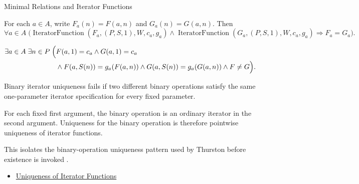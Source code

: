 \begin{topicbox}{Minimal Relations and Iterator Functions}
\begin{remark*}
For each $a\in A$, write $F_a(n)=F(a,n)$ and $G_a(n)=G(a,n)$. Then
\[
\forall a\in A\;
\bigl(\operatorname{IteratorFunction}(F_a,(P,S,1),W,c_a,g_a)
\land \operatorname{IteratorFunction}(G_a,(P,S,1),W,c_a,g_a)
\Longrightarrow F_a=G_a\bigr).
\]
\end{remark*}

\begin{remark*}
\[
\begin{aligned}
\exists a\in A\;\exists n\in P\;\Bigl(&
F(a,1)=c_a\land G(a,1)=c_a\\
&\land F(a,S(n))=g_a(F(a,n))
\land G(a,S(n))=g_a(G(a,n))
\land F\neq G\Bigr).
\end{aligned}
\]
\end{remark*}

\begin{remark*}
Binary iterator uniqueness fails if two different binary operations satisfy
the same one-parameter iterator specification for every fixed parameter.
\end{remark*}

\begin{remark*}[Interpretation]
For each fixed first argument, the binary operation is an ordinary iterator in
the second argument. Uniqueness for the binary operation is therefore
pointwise uniqueness of iterator functions.
\end{remark*}

\begin{remark*}
This isolates the binary-operation uniqueness pattern used by Thurston before
existence is invoked \citep{thurston1956numbersystem}.
\end{remark*}

\begin{dependencies}
\begin{itemize}
  \item \hyperref[lem:uniqueness-of-iterator-functions]{Uniqueness of Iterator Functions}
\end{itemize}
\end{dependencies}
\end{topicbox}

